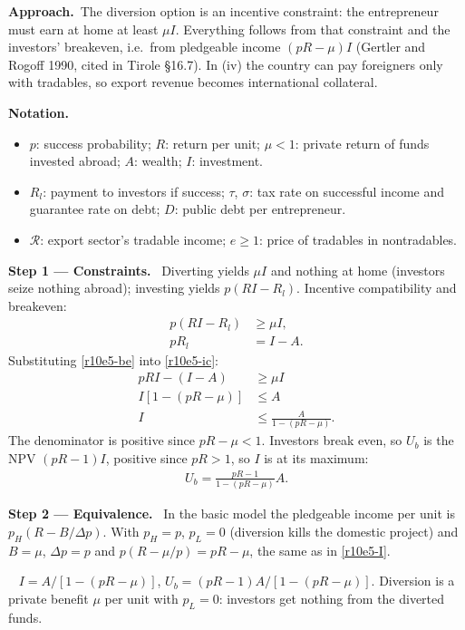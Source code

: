 \documentclass[11pt,a4paper]{article}
\newcommand{\notation}{\par\noindent\textbf{Notation.}}
\newcommand{\step}[2]{\par\medskip\noindent\textbf{Step #1 --- #2.}~}
\newcommand{\approach}{\par\smallskip\noindent\textbf{Approach.}~}
\newcommand{\answer}[1]{\par\smallskip\noindent\fbox{\textbf{Answer\if\relax\detokenize{#1}\relax\else\ #1\fi.}}~}
\newcommand{\Rc}{\mathcal{R}}
\begin{document}
\approach The diversion option is an incentive constraint: the entrepreneur must earn at home at least $\mu I$. Everything follows from that constraint and the investors' breakeven, i.e.\ from pledgeable income $(pR-\mu)I$ (Gertler and Rogoff 1990, cited in Tirole \S16.7). In (iv) the country can pay foreigners only with tradables, so export revenue becomes international collateral.

\notation
\begin{itemize}
  \item $p$: success probability; $R$: return per unit; $\mu<1$: private return of funds invested abroad; $A$: wealth; $I$: investment.
  \item $R_l$: payment to investors if success; $\tau$, $\sigma$: tax rate on successful income and guarantee rate on debt; $D$: public debt per entrepreneur.
  \item $\Rc$: export sector's tradable income; $e\geq1$: price of tradables in nontradables.
\end{itemize}

\step{1}{Constraints} Diverting yields $\mu I$ and nothing at home (investors seize nothing abroad); investing yields $p(RI-R_l)$. Incentive compatibility and breakeven:
\begin{align}
  p(RI-R_l) &\geq \mu I, \label{r10e5-ic}\\
  pR_l &= I-A. \label{r10e5-be}
\end{align}
Substituting \eqref{r10e5-be} into \eqref{r10e5-ic}:
\begin{align}
  pRI-(I-A) &\geq \mu I \nonumber\\
  I[1-(pR-\mu)] &\leq A \nonumber\\
  I &\leq \frac{A}{1-(pR-\mu)}. \label{r10e5-I}
\end{align}
The denominator is positive since $pR-\mu<1$. Investors break even, so $U_b$ is the NPV $(pR-1)I$, positive since $pR>1$, so $I$ is at its maximum:
\begin{align}
  U_b = \frac{pR-1}{1-(pR-\mu)}A. \label{r10e5-Ub}
\end{align}

\step{2}{Equivalence} In the basic model the pledgeable income per unit is $p_H(R-B/\Delta p)$. With $p_H=p$, $p_L=0$ (diversion kills the domestic project) and $B=\mu$, $\Delta p=p$ and $p(R-\mu/p)=pR-\mu$, the same as in \eqref{r10e5-I}.

\answer{(i)} $I=A/[1-(pR-\mu)]$, $U_b=(pR-1)A/[1-(pR-\mu)]$. Diversion is a private benefit $\mu$ per unit with $p_L=0$: investors get nothing from the diverted funds.
\end{document}
